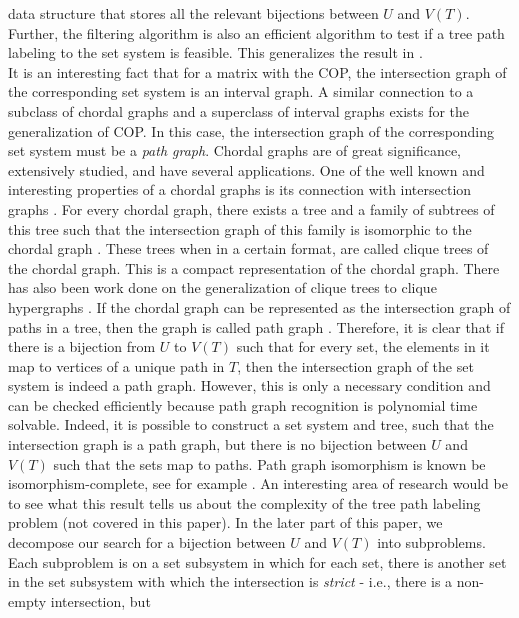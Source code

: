 \documentclass[a4paper,UKenglish,numberwithinsect]{lipics}
\begin{document}
data structure that stores all the relevant bijections between $U$ and
$V(T)$.  
Further, the filtering algorithm is also an efficient algorithm to test if a
tree path labeling to the set system is feasible.  This 
generalizes the result in \cite{nsnrs09}.\\
\noindent
It is an interesting fact that for a matrix with the COP, the
intersection graph of the corresponding set system is an interval
graph.  A similar connection to a subclass of chordal graphs and a
superclass of interval graphs exists for the generalization of COP.
In this case, the intersection graph of the corresponding set system
must be a {\em path graph}. Chordal graphs are of great significance,
extensively studied, and have several applications.  One of the well
known and interesting properties of a chordal graphs is its connection
with intersection graphs \cite{mcg04}. For every chordal graph, there
exists a tree and a family of subtrees of this tree such that the
intersection graph of this family is isomorphic to the chordal graph
\cite{plr70,gav78,bp93}.  These trees when in a certain format, are
called clique trees \cite{apy92} of the chordal graph. This is a
compact representation of the chordal graph. There has also been work
done on the generalization of clique trees to clique hypergraphs
\cite{km02}.  If the chordal graph can be represented as the
intersection graph of paths in a tree, then the graph is called path
graph \cite{mcg04}.  Therefore, it is clear that if there is a
bijection from $U$ to $V(T)$ such that for every set, the elements in
it map to vertices of a unique path in $T$, then the intersection
graph of the set system is indeed a path graph.  However, this is only
a necessary condition and can be checked efficiently because path
graph recognition is polynomial time
solvable\cite{gav78,aas93}. Indeed, it is possible to construct a set
system and tree, such that the intersection graph is a path graph, but
there is no bijection between $U$ and $V(T)$ such that the sets map to
paths. Path graph isomorphism is known be isomorphism-complete, see
for example \cite{kklv10}. An interesting area of research would be to see
what this result tells us about the complexity of the tree path
labeling problem (not covered in this paper). In the later part of
this paper, we decompose our search for a bijection between $U$ and
$V(T)$ into subproblems.  Each subproblem is on a set subsystem in which
for each set, there is another set in the set subsystem with which the
intersection is {\em strict} - i.e., there is a non-empty intersection, but
\end{document}
